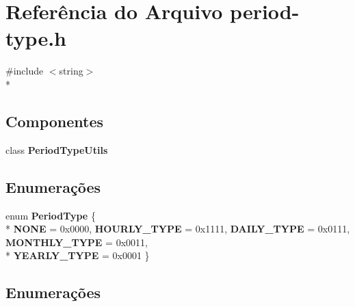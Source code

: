 \section{Referência do Arquivo period-\/type.h}
\label{period-type_8h}
{\ttfamily \#include $<$string$>$}\\*
\subsection*{Componentes}
\begin{DoxyCompactItemize}
\item 
class {\bf Period\+Type\+Utils}
\end{DoxyCompactItemize}
\subsection*{Enumerações}
\begin{DoxyCompactItemize}
\item 
enum {\bf Period\+Type} \{ \\*
{\bf N\+O\+NE} = 0x0000, 
{\bf H\+O\+U\+R\+L\+Y\+\_\+\+T\+Y\+PE} = 0x1111, 
{\bf D\+A\+I\+L\+Y\+\_\+\+T\+Y\+PE} = 0x0111, 
{\bf M\+O\+N\+T\+H\+L\+Y\+\_\+\+T\+Y\+PE} = 0x0011, 
\\*
{\bf Y\+E\+A\+R\+L\+Y\+\_\+\+T\+Y\+PE} = 0x0001
 \}
\end{DoxyCompactItemize}


\subsection{Enumerações}

